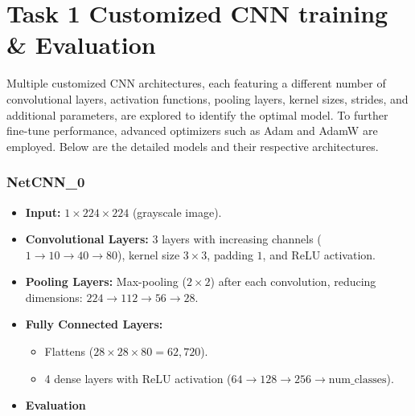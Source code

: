 \documentclass[12pt]{article}
\begin{document}
\section*{Task 1 Customized CNN training \& Evaluation}
Multiple customized CNN architectures, each featuring a different number of convolutional layers, activation functions, pooling layers, kernel sizes, strides, and additional parameters, are explored to identify the optimal model. To further fine-tune performance, advanced optimizers such as Adam and AdamW are employed. Below are the detailed models and their respective architectures.

\subsubsection*{NetCNN\_0}

\begin{itemize}
    \item \textbf{Input:} \(1 \times 224 \times 224\) (grayscale image).
    \item \textbf{Convolutional Layers:} 3 layers with increasing channels (\(1 \to 10 \to 40 \to 80\)), kernel size \(3 \times 3\), padding \(1\), and ReLU activation.
    \item \textbf{Pooling Layers:} Max-pooling (\(2 \times 2\)) after each convolution, reducing dimensions: \(224 \to 112 \to 56 \to 28\).
    \item \textbf{Fully Connected Layers:} 
    \begin{itemize}
        \item Flattens (\(28 \times 28 \times 80 = 62,720\)).
        \item 4 dense layers with ReLU activation (\(64 \to 128 \to 256 \to \text{num\_classes}\)).
    \end{itemize}
    \item \textbf{Evaluation}
\end{itemize}

\end{document}
